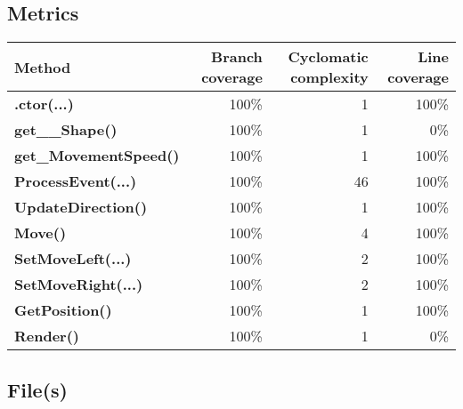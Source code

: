 \documentclass[a4paper,landscape,10pt]{article}
\begin{document}
\subsection{Metrics}
\begin{longtable}[l]{|l|r|r|r|}
\hline
\textbf{Method} & \textbf{Branch coverage} & \textbf{Cyclomatic complexity} & \textbf{Line coverage}\\
\hline
\textbf{.ctor(...)} & 100\% & 1 & 100\%\\
\hline
\textbf{get\_\_Shape()} & 100\% & 1 & 0\%\\
\hline
\textbf{get\_MovementSpeed()} & 100\% & 1 & 100\%\\
\hline
\textbf{ProcessEvent(...)} & 100\% & 46 & 100\%\\
\hline
\textbf{UpdateDirection()} & 100\% & 1 & 100\%\\
\hline
\textbf{Move()} & 100\% & 4 & 100\%\\
\hline
\textbf{SetMoveLeft(...)} & 100\% & 2 & 100\%\\
\hline
\textbf{SetMoveRight(...)} & 100\% & 2 & 100\%\\
\hline
\textbf{GetPosition()} & 100\% & 1 & 100\%\\
\hline
\textbf{Render()} & 100\% & 1 & 0\%\\
\hline
\end{longtable}
\subsection{File(s)}
\end{document}
